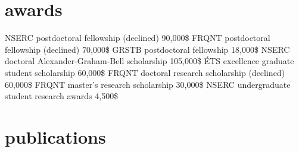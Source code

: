 \documentclass[print]{friggeri-cv}
\begin{document}
\section{awards}
\begin{entrylist}
   {{\small NSERC} postdoctoral fellowship (declined)} {90,000\$} {\vspace{-3mm}}
   {{\small FRQNT} postdoctoral fellowship (declined)} {70,000\$} {\vspace{-3mm}}
   {{\small GRSTB} postdoctoral fellowship} {18,000\$} {\vspace{-3mm}}
   {{\small NSERC} doctoral Alexander-Graham-Bell scholarship} {105,000\$} {\vspace{-3mm}}
   {{\small ÉTS} excellence graduate student scholarship} {60,000\$} {\vspace{-3mm}}
   {{\small FRQNT} doctoral research scholarship (declined)} {60,000\$} {\vspace{-3mm}}
   {{\small FRQNT} master's research scholarship} {30,000\$} {\vspace{-3mm}}
   {{\small NSERC} undergraduate student research awards} {4,500\$} {\vspace{-3mm}}
 \end{entrylist}


\newpage


\section{publications}
\vspace{-3mm}
\newrefcontext[sorting=chronological]
\nocite{*}
\printbibliography[
  type=article,
  title={articles in peer-reviewed journals},
  heading=subbibliography]
\printbibliography[
  type=inproceedings,
  title={international peer-reviewed conferences/proceedings},
  heading=subbibliography]
\end{document}
